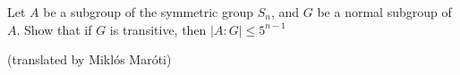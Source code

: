 Let $A$ be a subgroup of the symmetric group $S_n$, and $G$ be a normal subgroup of $A$. Show that if $G$ is transitive, then $|A\colon G|\le 5^{n-1}$

(translated by Miklós Maróti)
